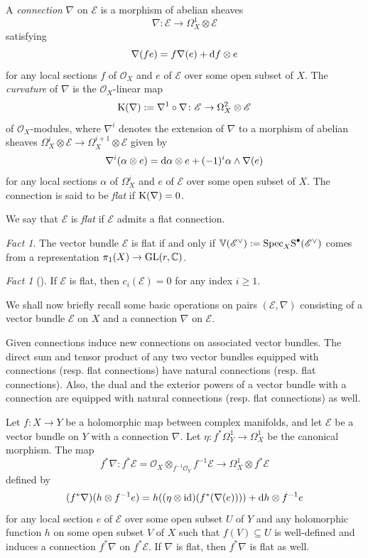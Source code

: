 \documentclass[english,10pt]{amsart}
\renewcommand{\ge}{\geqslant}
\newcommand{\sE}{\mathscr{E}}
\newcommand{\sO}{\mathscr{O}}
\newcommand{\dd}{\textup{d}}
\theoremstyle{definition}
\theoremstyle{remark}
\newtheorem{fact}[thm]{Fact}
\numberwithin{equation}{section}
\begin{document}
A \emph{connection} $\nabla$ on $\sE$ is a morphism of abelian sheaves
\[
\nabla\colon \sE \to \Omega_X^1\otimes\sE
\] 
satisfying 
\[
\nabla(fe)=f\nabla(e)+\dd f \otimes e
\] 
for any local sections $f$ of $\sO_X$ and $e$ of $\sE$ over some open subset of $X$. The \emph{curvature} of $\nabla$ is the $\sO_X$-linear map
\[
\textup{K}(\nabla):=\nabla^1\circ\nabla\colon \sE \to \Omega_X^2\otimes \sE
\]
of $\sO_X$-modules, where $\nabla^i$ denotes the extension of $\nabla$ to 
a morphism of abelian sheaves $\Omega_X^i \otimes \sE \to \Omega_X^{i+1} \otimes \sE$ given by 
\[
\nabla^i(\alpha\otimes e)= \dd \alpha \otimes e + (-1)^i \alpha \wedge \nabla(e)
\]
for any local sections $\alpha$ of $\Omega_X^i$ and $e$ of $\sE$ over some open subset of $X$. 
The connection is said to be \textit{flat} if $\textup{K}(\nabla)=0$.

\medskip

We say that $\sE$ is \emph{flat} if $\sE$ admits a flat connection.
 
\begin{fact}
The vector bundle $\sE$ is flat if and only if $\mathbb{V}(\sE^\vee):=\textup{Spec}_X\textup{S}^\bullet(\sE^\vee)$ comes from a representation $\pi_1(X) \to \textup{GL}(r,\mathbb{C})$.
\end{fact}

\begin{fact}[{\cite[Proposition II.3.1(a)]{kobayashi_diff_geom_vb}}]\label{fact:connection_vanishing_chern_classes}
If $\sE$ is flat, then $c_i(\sE)=0$ for any index $i \ge 1$. 
\end{fact}


\medskip

We shall now briefly recall some basic operations on pairs $(\sE,\nabla)$ consisting of a vector bundle $\sE$ on $X$ and a connection $\nabla$ on $\sE$.

\medskip

Given connections induce new connections on associated vector bundles. The direct sum and tensor product of any two vector bundles equipped with connections (resp. flat connections) have natural connections (resp. flat connections). Also, the dual and the exterior powers of a vector bundle with a connection are equipped with natural connections (resp. flat connections) as well. 

\medskip

Let $f \colon X \to Y$ be a holomorphic map between complex manifolds, and let $\sE$ be a vector bundle on $Y$ with a connection $\nabla$. Let $\eta\colon f^*\Omega_Y^1 \to \Omega_X^1$ be the canonical morphism. The map 
\[
f^*\nabla \colon f^*\sE = \sO_X \otimes_{f^{-1}\sO_Y} f^{-1}\sE \to \Omega_X^1 \otimes f^*\sE 
\]
defined by 
\[
(f^*\nabla) (h \otimes f^{-1}e) = h ((\eta \otimes \textup{id})(f^*(\nabla (e)))) + \dd h \otimes f^{-1}e 
\]
for any local section $e$ of $\sE$ over some open subset $U$ of $Y$ and any holomorphic function $h$ on some open subset $V$ of $X$ such that $f(V) \subseteq U$ is well-defined and induces a connection $f^*\nabla$ on $f^*\sE$. If $\nabla$ is flat, then $f^*\nabla$ is flat as well. 
\end{document}
